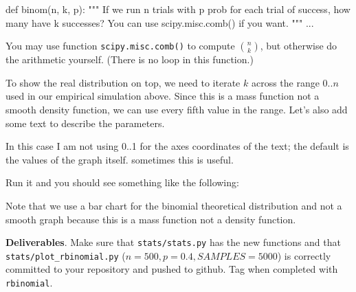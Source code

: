 \begin{fullwidth}
\begin{pyverbatim}
def binom(n, k, p):
    """
    If we run n trials with p prob for each trial of success,
    how many have k successes? You can use scipy.misc.comb() if you want.
    """
    ...
\end{pyverbatim}

\noindent You may use function {\tt scipy.misc.comb()} to compute $n \choose k$, but otherwise do the arithmetic yourself. (There is no loop in this function.)

\step To show the real distribution on top, we need to iterate $k$ across the range $0..n$ used in our empirical  simulation above.  Since this is a mass function not a smooth density function, we can use every fifth value in the range. Let's also add some text to describe the parameters.


In this case I am not using 0..1 for the axes coordinates of the text; the default is the values of the graph itself. sometimes this is useful.

\step Run it and you should see something like the following:


Note that we use a bar chart for the binomial theoretical distribution and not a smooth graph because this is a mass function not a density function.

\begin{callout}{\bcplume}
{\bf Deliverables}. Make sure that {\tt stats/stats.py} has the new functions and that {\tt stats/plot\_rbinomial.py} ($n=500, p=0.4, SAMPLES=5000$) is correctly committed to your repository and pushed to github. Tag when completed with {\tt rbinomial}.
\end{callout}

\end{fullwidth}
